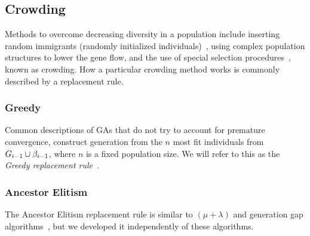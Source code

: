 \subsection{Crowding}\label{sec:replacementrules}
Methods to overcome decreasing diversity in a population include inserting random immigrants (randomly initialized individuals)~\cite{Cobb93geneticalgorithms}, using complex population structures to lower the gene flow, and the use of special selection procedures~\cite{ursem2002diversity, DeJong:1975:ABC:907087}, known as crowding. How a particular crowding method works is commonly described by a replacement rule.

\subsubsection{Greedy}
Common descriptions of GAs that do not try to account for premature convergence,
construct generation  from the $n$ most fit individuals from $G_{i-1} \cup \beta_{i-1}$, where $n$ is a fixed population size. We will refer to this as the \emph{Greedy replacement rule}~\cite{masterThesisGANN}.


%

\subsubsection{Ancestor Elitism}
The Ancestor Elitism replacement rule is similar to $\left(\mu + \lambda\right)$ and generation gap algorithms~\cite{Luke2013Metaheuristics}, but we developed it independently of these algorithms.


